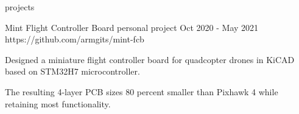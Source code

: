 \begin{section}{projects}
\begin{project}
  \end{project}





  \begin{project}
    {Mint Flight Controller Board}
    {personal project}
    {Oct 2020 - May 2021}
    {https://github.com/armgits/mint-fcb}

    \item Designed a miniature flight controller board for quadcopter drones
          in KiCAD based on STM32H7 microcontroller.

    \item The resulting 4-layer PCB sizes 80 percent smaller than Pixhawk 4
          while retaining most functionality.

  \end{project}










\end{section}
